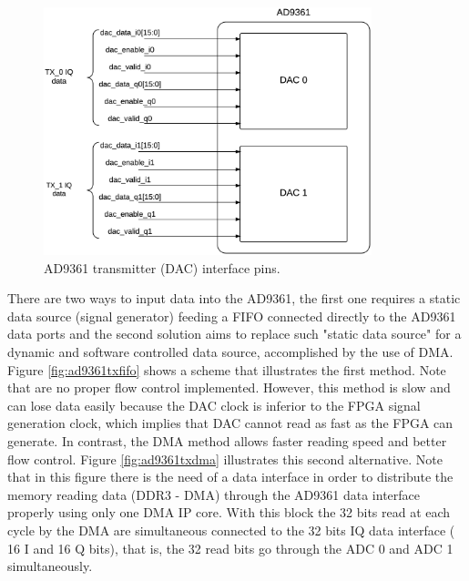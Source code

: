 \begin{figure}[htbp]
    \centering
    \includegraphics[width=0.85\textwidth]{./figures/ad9361tx_pins}
    \caption{ AD9361 transmitter (DAC) interface pins.
    \label{fig:txpins}}
\end{figure}

There are two ways to input data into the AD9361, the first one requires a
static data source (signal generator) feeding a FIFO connected directly to the
AD9361 data ports and the second solution aims to replace such "static data
source" for a dynamic and software controlled data source, accomplished by the
use of DMA. Figure \ref{fig:ad9361txfifo} shows a scheme that illustrates the
first method. Note that are no proper flow control implemented. However, this
method is slow and can lose data easily because the DAC clock is inferior to the
FPGA signal generation clock, which implies that DAC cannot read as fast as the
FPGA can generate. In contrast, the DMA method allows faster reading speed and
better flow control. Figure \ref{fig:ad9361txdma} illustrates this second
alternative. Note that in this figure there is the need of a data interface in
order to distribute the memory reading data (DDR3 - DMA) through the AD9361 data
interface properly using only one DMA IP core. With this block the 32 bits read
at each cycle by the DMA are simultaneous connected to the 32 bits IQ data
interface ( 16 I and 16 Q bits), that is, the 32 read bits go through the ADC 0
and ADC 1 simultaneously.


